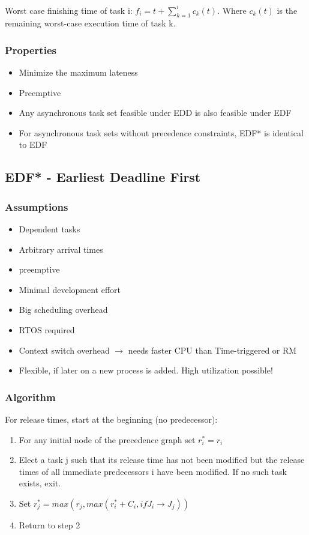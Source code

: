 \begin{tnote}
Worst case finishing time of task i: $f_i = t + \sum\limits_{k = 1}^{i} c_k(t)$. Where $c_k(t)$ is the remaining worst-case execution time of task k.
\end{tnote}

\subsubsection{Properties}
\begin{itemize}[noitemsep]
\item Minimize the maximum lateness
\item Preemptive
\item Any asynchronous task set feasible under EDD is also feasible under EDF
\item For asynchronous task sets without precedence constraints, EDF* is identical to EDF
\end{itemize}



\subsection{EDF*  - Earliest Deadline First}
\subsubsection{Assumptions}
\begin{itemize}[noitemsep]
\item Dependent tasks
\item Arbitrary arrival times
\item preemptive
\item Minimal development effort
\item Big scheduling overhead
\item RTOS required
\item Context switch overhead $\rightarrow$ needs faster CPU than Time-triggered or RM
\item Flexible, if later on a new process is added. High utilization possible!
\end{itemize}



\subsubsection{Algorithm}
For release times, start at the beginning (no predecessor):
\begin{enumerate} [noitemsep]
\item For any initial node of the precedence graph set $r_i^* = r_i$
\item Elect a task j such that its release time has not been modified 
but the release times of all immediate predecessors i have 
been modified. If no such task exists, exit. 
\item Set $r_j^* = max(r_j, max(r_i^* + C_i, if J_i \rightarrow J_j))$
\item Return to step 2
\end{enumerate}

